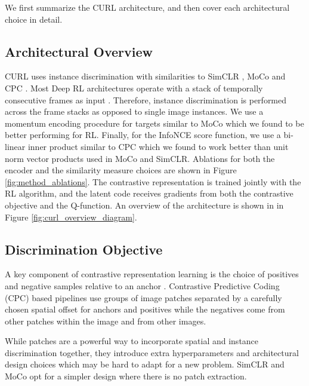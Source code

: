 \documentclass{article}
\begin{document}
We first summarize the CURL architecture, and then cover each architectural choice in detail.

\subsection{Architectural Overview}

CURL uses instance discrimination with similarities to SimCLR \cite{chen2020simclr}, MoCo \cite{he2019momentum} and CPC \cite{henaff2019data}. Most Deep RL architectures operate with a stack of temporally consecutive frames as input \cite{hessel2017rainbow}. Therefore, instance discrimination is performed across the frame stacks as opposed to single image instances. We use a momentum encoding procedure for targets similar to MoCo \cite{kaiming2019moco} which we found to be better performing for RL. Finally, for the InfoNCE score function, we use a bi-linear inner product similar to CPC \cite{oord2018representation} which we found to work better than unit norm vector products used in MoCo and SimCLR. Ablations for both the encoder and the similarity measure choices are shown in Figure \ref{fig:method_ablations}. The contrastive representation is trained jointly with the RL algorithm, and the latent code receives gradients from both the contrastive objective and the Q-function. An overview of the architecture is shown in in Figure \ref{fig:curl_overview_diagram}.


\subsection{Discrimination Objective}
A key component of contrastive representation learning is the choice of positives and negative samples relative to an anchor \cite{bachman2019learning, tian2019contrastive, henaff2019data, he2019momentum, chen2020simclr}. Contrastive Predictive Coding (CPC) based pipelines \cite{henaff2019data, oord2018representation} use groups of image patches separated by a carefully chosen spatial offset for anchors and positives while the negatives come from other patches within the image and from other images. 

While patches are a powerful way to incorporate spatial and instance discrimination together, they introduce extra hyperparameters and architectural design choices which may be hard to adapt for a new problem. SimCLR \cite{chen2020simclr} and MoCo \cite{he2019momentum} opt for a simpler design where there is no patch extraction. 
\end{document}
